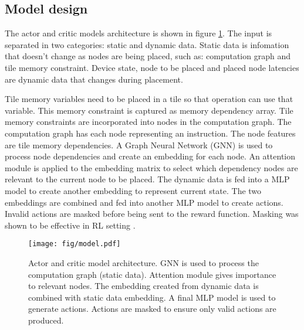 \subsection{Model design}

The actor and critic models architecture is shown in figure \ref{fig:model}. 
The input is separated in two categories: static and dynamic data. 
Static data is infomation that doesn't change as nodes are being placed, such as: computation graph and tile memory constraint.
Device state, node to be placed and placed node latencies are dynamic data that changes during placement.

Tile memory variables need to be placed in a tile so that operation can use that variable. This memory constraint is captured as 
memory dependency array. Tile memory constraints are incorporated into nodes in the computation graph. The computation graph 
has each node representing an instruction. The node features are tile memory dependencies. A Graph Neural Network (GNN) is 
used to process node dependencies and create an embedding for each node. An attention module is applied to the embedding matrix 
to select which dependency nodes are relevant to the current node to be placed. The dynamic data is fed into a MLP model to 
create another embedding to represent current state. The two embeddings are combined and fed into another MLP model to 
create actions. Invalid actions are masked before being sent to the reward function. Masking was shown to be effective in RL setting \cite{Shengyi_mask}.

\begin{figure}[h]
  \centering
  \texttt{[image: fig/model.pdf]}
  \caption{Actor and critic model architecture. GNN is used to process the computation graph (static data). 
  Attention module gives importance to relevant nodes. The embedding created from dynamic data is combined with static data embedding. 
  A final MLP model is used to generate actions. Actions are masked to ensure only valid actions are produced. }
  \label{fig:model}
\end{figure}

